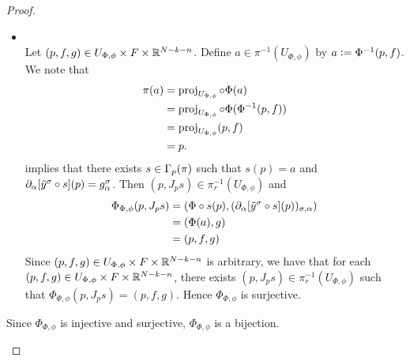 \documentclass{book}
\begin{document}
\begin{proof}
\begin{enumerate}
\begin{itemize}
\begin{align*}
				\tl{y}^{\sig} \circ s_1(p_1)
				& = \prj^k_{\sig} \circ \phi(s_1(p_1)) \\
				& = \prj^k_{\sig} \circ \phi(s_2(p_2)) \\
				& = \tl{y}^{\sig} \circ s_2(p_2).
			\end{align*}
			Therefore $s_1 \sim_{r, p} s_2$ and $J^r_{p_1} s_1 = J^r_{p_2} s_2$. Hence 
			\begin{align*}
				b_1
				& = (p_1, J^r_{p_1} s_1) \\
				& = (p_2, J^r_{p_2} s_2) \\
				& = b_2.
			\end{align*}
			Since $b_1, b_2 \in \pi_r^{-1}(U_{\Phi, \phi})$ are arbitrary, we have that for each $b_1, b_2 \in \pi_r^{-1}(U_{\Phi, \phi})$, $\Phi^r_{\Phi, \phi}(b_1) = \Phi^r_{\Phi, \phi}(b_2)$ implies that $b_1 = b_2$. Thus $\Phi^r_{\Phi, \phi}$ is injective. 
			\item {} \\
			Let $(p, f, g) \in U_{\Phi, \phi} \times F \times \mathbb{R}^{N - k - n}$. Define $a \in \pi^{-1}(U_{\Phi, \phi})$ by $a \vcentcolon= \Phi^{-1}(p, f)$. We note that 
			\begin{align*}
				\pi(a)
				& = \operatorname{\text{proj}}_{U_{\Phi, \phi}} \circ \Phi (a) \\
				& = \operatorname{\text{proj}}_{U_{\Phi, \phi}} \circ \Phi (\Phi^{-1}(p, f)) \\
				& = \operatorname{\text{proj}}_{U_{\Phi, \phi}}(p, f) \\
				& = p.
			\end{align*}
			  implies that there exists $s \in \Gamma_p(\pi)$ such that $s(p) = a$ and $\partial_{\alpha}[\tilde{y}^{\sigma} \circ s](p) = g^{\sigma}_{\alpha}$. Then $(p, J_p s) \in \pi_r^{-1}(U_{\Phi, \phi})$ and
			 \begin{align*}
			 	\Phi_{\Phi, \phi}(p, J_p s)
			 	& = (\Phi \circ s(p), (\partial_{\alpha}[\tilde{y}^{\sigma} \circ s](p))_{\sigma, \alpha}) \\
			 	& = (\Phi(a), g) \\
			 	& = (p,f,g)
			 \end{align*}
		 	Since $(p, f, g) \in U_{\Phi, \phi} \times F \times \mathbb{R}^{N - k - n}$ is arbitrary, we have that for each $(p, f, g) \in U_{\Phi, \phi} \times F \times \mathbb{R}^{N - k - n}$, there exists $(p, J_p s) \in \pi_r^{-1}(U_{\Phi, \phi})$ such that $\Phi_{\Phi, \phi}(p, J_p s) = (p, f, g)$. Hence $\Phi_{\Phi, \phi}$ is surjective.
		\end{itemize}
		Since $\Phi_{\Phi, \phi}$ is injective and surjective, $\Phi_{\Phi, \phi}$ is a bijection.

\end{enumerate}
\end{proof}
\end{document}
